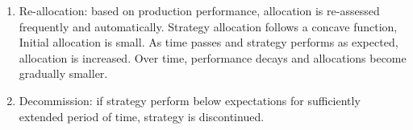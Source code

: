 \begin{method}
\begin{enumerate}[label=\roman*.]
\begin{enumerate}[label=\arabic*.]
\item Re-allocation: based on production performance, allocation is re-assessed frequently and automatically. Strategy allocation follows a concave function, Initial allocation is small. As time passes and strategy performs as expected, allocation is increased. Over time, performance decays and allocations become gradually smaller.
\item Decommission: if strategy perform below expectations for sufficiently extended period of time, strategy is discontinued.
\end{enumerate}
\end{enumerate}
\end{method}














